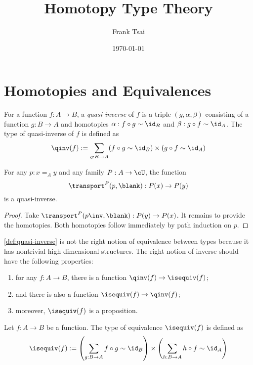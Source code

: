 \documentclass{amsart}
\title{Homotopy Type Theory}
\author{Frank Tsai}
\date{\today}
\begin{document}
\maketitle
\tableofcontents

\section{Homotopies and Equivalences}
\label{sec:homotopies-and-equivalences}
\begin{defn}\label{def:quasi-inverse}
  For a function $f : A \to B$, a \emph{quasi-inverse} of $f$ is a triple $(g, \alpha, \beta)$ consisting of a function $g : B \to A$ and homotopies $\alpha : f \circ g \sim \id_{B}$ and $\beta : g \circ f \sim \id_{A}$.
  The type of quasi-inverse of $f$ is defined as
  \[
    \qinv(f) := \sum_{g : B \to A}(f \circ g \sim \id_{B}) \times (g \circ f \sim \id_{A})
  \]
\end{defn}

\begin{lem}
  For any $p : x =_{A} y$ and any family $P : A \to \cU$, the function
  \[
    \transport^{P}(p,\blank) : P(x) \to P(y)
  \]
  is a quasi-inverse.
\end{lem}
\begin{proof}
  Take $\transport^{P}(p\inv,\blank) : P(y) \to P(x)$.
  It remains to provide the homotopies.
  Both homotopies follow immediately by path induction on $p$.
\end{proof}

\cref{def:quasi-inverse} is not the right notion of equivalence between types because it has nontrivial high dimensional structures.
The right notion of inverse should have the following properties:
\begin{enumerate}
\item for any $f : A \to B$, there is a function $\qinv(f) \to \isequiv(f)$;
\item and there is also a function $\isequiv(f) \to \qinv(f)$;
\item moreover, $\isequiv(f)$ is a proposition.
\end{enumerate}

\begin{defn}
  Let $f : A \to B$ be a function.
  The type of equivalence $\isequiv(f)$ is defined as
  \[
    \isequiv(f) := \left(\sum_{g : B \to A}f \circ g \sim \id_{B}\right) \times \left(\sum_{h : B \to A}h \circ f \sim \id_{A}\right)
  \]
\end{defn}
\end{document}
